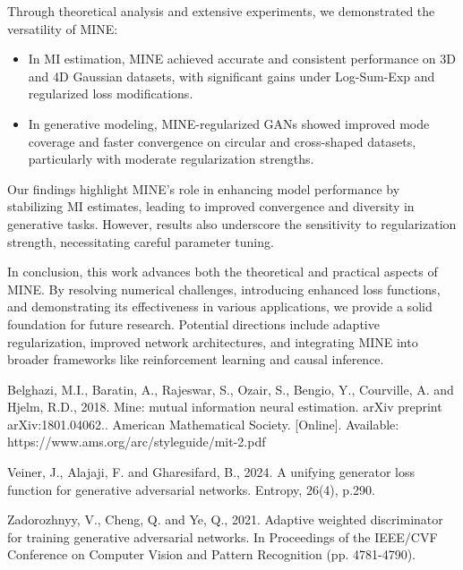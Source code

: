 \documentclass[lettersize,journal]{IEEEtran}
\begin{document}
Through theoretical analysis and extensive experiments, we demonstrated the versatility of MINE:
\begin{itemize}
    \item In MI estimation, MINE achieved accurate and consistent performance on 3D and 4D Gaussian datasets, with significant gains under Log-Sum-Exp and regularized loss modifications.
    \item In generative modeling, MINE-regularized GANs showed improved mode coverage and faster convergence on circular and cross-shaped datasets, particularly with moderate regularization strengths.
\end{itemize}

Our findings highlight MINE's role in enhancing model performance by stabilizing MI estimates, leading to improved convergence and diversity in generative tasks. However, results also underscore the sensitivity to regularization strength, necessitating careful parameter tuning.

In conclusion, this work advances both the theoretical and practical aspects of MINE. By resolving numerical challenges, introducing enhanced loss functions, and demonstrating its effectiveness in various applications, we provide a solid foundation for future research. Potential directions include adaptive regularization, improved network architectures, and integrating MINE into broader frameworks like reinforcement learning and causal inference.


\begin{thebibliography}{1}


Belghazi, M.I., Baratin, A., Rajeswar, S., Ozair, S., Bengio, Y., Courville, A. and Hjelm, R.D., 2018. Mine: mutual information neural estimation. arXiv preprint arXiv:1801.04062.. American Mathematical Society. [Online]. Available: https://www.ams.org/arc/styleguide/mit-2.pdf

Veiner, J., Alajaji, F. and Gharesifard, B., 2024. A unifying generator loss function for generative adversarial networks. Entropy, 26(4), p.290.

Zadorozhnyy, V., Cheng, Q. and Ye, Q., 2021. Adaptive weighted discriminator for training generative adversarial networks. In Proceedings of the IEEE/CVF Conference on Computer Vision and Pattern Recognition (pp. 4781-4790).

\end{thebibliography}


\newpage




\vfill
\end{document}
